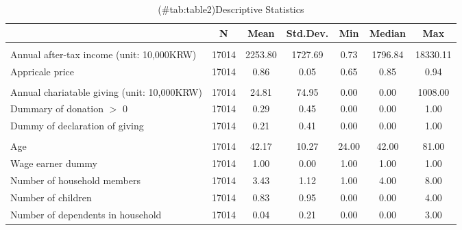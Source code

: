 \begin{table}

\caption{(\#tab:table2)Descriptive Statistics\label{tab:summary-covariate}}
\centering
\fontsize{8}{10}\selectfont
\begin{threeparttable}
\begin{tabular}[t]{lcccccc}
\toprule
  & N & Mean & Std.Dev. & Min & Median & Max\\
\midrule
\addlinespace[0.3em]
\multicolumn{7}{l}{\textit{Income and giving price}}\\
\hspace{1em}Annual after-tax income (unit: 10,000KRW) & 17014 & \num{2253.80} & \num{1727.69} & \num{0.73} & \num{1796.84} & \num{18330.11}\\
\hspace{1em}Appricale price & 17014 & \num{0.86} & \num{0.05} & \num{0.65} & \num{0.85} & \num{0.94}\\
\addlinespace[0.3em]
\multicolumn{7}{l}{\textit{Charitable giving}}\\
\hspace{1em}Annual chariatable giving (unit: 10,000KRW) & 17014 & \num{24.81} & \num{74.95} & \num{0.00} & \num{0.00} & \num{1008.00}\\
\hspace{1em}Dummary of donation $>$ 0 & 17014 & \num{0.29} & \num{0.45} & \num{0.00} & \num{0.00} & \num{1.00}\\
\hspace{1em}Dummy of declaration of giving & 17014 & \num{0.21} & \num{0.41} & \num{0.00} & \num{0.00} & \num{1.00}\\
\addlinespace[0.3em]
\multicolumn{7}{l}{\textit{Demographics}}\\
\hspace{1em}Age & 17014 & \num{42.17} & \num{10.27} & \num{24.00} & \num{42.00} & \num{81.00}\\
\hspace{1em}Wage earner dummy & 17014 & \num{1.00} & \num{0.00} & \num{1.00} & \num{1.00} & \num{1.00}\\
\hspace{1em}Number of household members & 17014 & \num{3.43} & \num{1.12} & \num{1.00} & \num{4.00} & \num{8.00}\\
\hspace{1em}Number of children & 17014 & \num{0.83} & \num{0.95} & \num{0.00} & \num{0.00} & \num{4.00}\\
\hspace{1em}Number of dependents in household & 17014 & \num{0.04} & \num{0.21} & \num{0.00} & \num{0.00} & \num{3.00}\\

\end{tabular}
\end{threeparttable}
\end{table}
